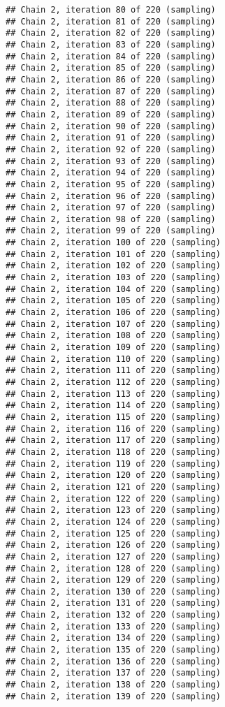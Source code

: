 \documentclass[]{book}
\begin{document}
\begin{verbatim}
## Chain 2, iteration 80 of 220 (sampling)
## Chain 2, iteration 81 of 220 (sampling)
## Chain 2, iteration 82 of 220 (sampling)
## Chain 2, iteration 83 of 220 (sampling)
## Chain 2, iteration 84 of 220 (sampling)
## Chain 2, iteration 85 of 220 (sampling)
## Chain 2, iteration 86 of 220 (sampling)
## Chain 2, iteration 87 of 220 (sampling)
## Chain 2, iteration 88 of 220 (sampling)
## Chain 2, iteration 89 of 220 (sampling)
## Chain 2, iteration 90 of 220 (sampling)
## Chain 2, iteration 91 of 220 (sampling)
## Chain 2, iteration 92 of 220 (sampling)
## Chain 2, iteration 93 of 220 (sampling)
## Chain 2, iteration 94 of 220 (sampling)
## Chain 2, iteration 95 of 220 (sampling)
## Chain 2, iteration 96 of 220 (sampling)
## Chain 2, iteration 97 of 220 (sampling)
## Chain 2, iteration 98 of 220 (sampling)
## Chain 2, iteration 99 of 220 (sampling)
## Chain 2, iteration 100 of 220 (sampling)
## Chain 2, iteration 101 of 220 (sampling)
## Chain 2, iteration 102 of 220 (sampling)
## Chain 2, iteration 103 of 220 (sampling)
## Chain 2, iteration 104 of 220 (sampling)
## Chain 2, iteration 105 of 220 (sampling)
## Chain 2, iteration 106 of 220 (sampling)
## Chain 2, iteration 107 of 220 (sampling)
## Chain 2, iteration 108 of 220 (sampling)
## Chain 2, iteration 109 of 220 (sampling)
## Chain 2, iteration 110 of 220 (sampling)
## Chain 2, iteration 111 of 220 (sampling)
## Chain 2, iteration 112 of 220 (sampling)
## Chain 2, iteration 113 of 220 (sampling)
## Chain 2, iteration 114 of 220 (sampling)
## Chain 2, iteration 115 of 220 (sampling)
## Chain 2, iteration 116 of 220 (sampling)
## Chain 2, iteration 117 of 220 (sampling)
## Chain 2, iteration 118 of 220 (sampling)
## Chain 2, iteration 119 of 220 (sampling)
## Chain 2, iteration 120 of 220 (sampling)
## Chain 2, iteration 121 of 220 (sampling)
## Chain 2, iteration 122 of 220 (sampling)
## Chain 2, iteration 123 of 220 (sampling)
## Chain 2, iteration 124 of 220 (sampling)
## Chain 2, iteration 125 of 220 (sampling)
## Chain 2, iteration 126 of 220 (sampling)
## Chain 2, iteration 127 of 220 (sampling)
## Chain 2, iteration 128 of 220 (sampling)
## Chain 2, iteration 129 of 220 (sampling)
## Chain 2, iteration 130 of 220 (sampling)
## Chain 2, iteration 131 of 220 (sampling)
## Chain 2, iteration 132 of 220 (sampling)
## Chain 2, iteration 133 of 220 (sampling)
## Chain 2, iteration 134 of 220 (sampling)
## Chain 2, iteration 135 of 220 (sampling)
## Chain 2, iteration 136 of 220 (sampling)
## Chain 2, iteration 137 of 220 (sampling)
## Chain 2, iteration 138 of 220 (sampling)
## Chain 2, iteration 139 of 220 (sampling)

\end{verbatim}
\end{document}
